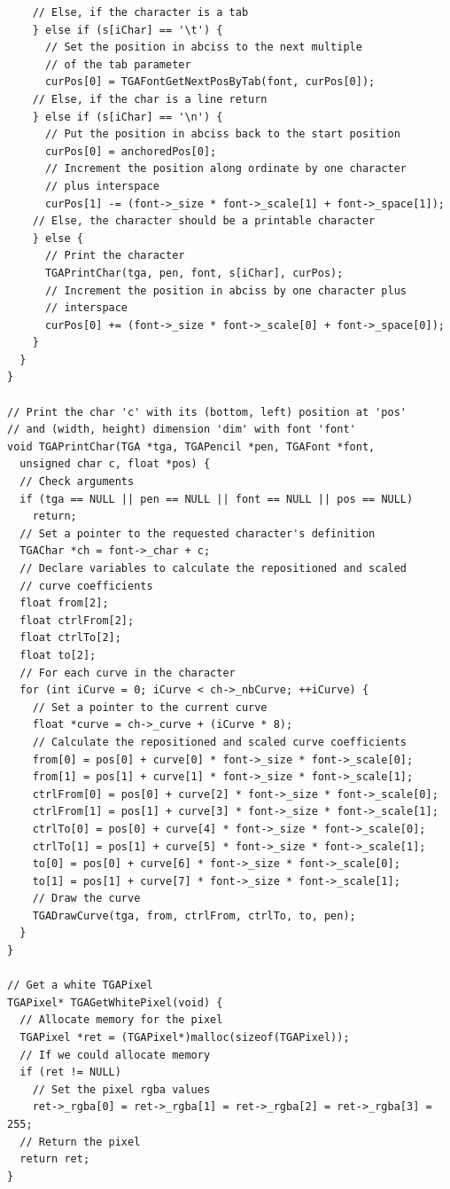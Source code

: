 \documentclass[12pt, a4paper]{article}
\begin{document}
\begin{scriptsize}
\begin{ttfamily}
\begin{lstlisting}
    // Else, if the character is a tab
    } else if (s[iChar] == '\t') {
      // Set the position in abciss to the next multiple 
      // of the tab parameter
      curPos[0] = TGAFontGetNextPosByTab(font, curPos[0]);
    // Else, if the char is a line return
    } else if (s[iChar] == '\n') {
      // Put the position in abciss back to the start position
      curPos[0] = anchoredPos[0];
      // Increment the position along ordinate by one character 
      // plus interspace
      curPos[1] -= (font->_size * font->_scale[1] + font->_space[1]);
    // Else, the character should be a printable character
    } else {
      // Print the character
      TGAPrintChar(tga, pen, font, s[iChar], curPos);
      // Increment the position in abciss by one character plus
      // interspace
      curPos[0] += (font->_size * font->_scale[0] + font->_space[0]);
    }
  }
}

// Print the char 'c' with its (bottom, left) position at 'pos'
// and (width, height) dimension 'dim' with font 'font'
void TGAPrintChar(TGA *tga, TGAPencil *pen, TGAFont *font, 
  unsigned char c, float *pos) {
  // Check arguments
  if (tga == NULL || pen == NULL || font == NULL || pos == NULL)
    return;
  // Set a pointer to the requested character's definition
  TGAChar *ch = font->_char + c;
  // Declare variables to calculate the repositioned and scaled 
  // curve coefficients
  float from[2];
  float ctrlFrom[2];
  float ctrlTo[2];
  float to[2];
  // For each curve in the character
  for (int iCurve = 0; iCurve < ch->_nbCurve; ++iCurve) {
    // Set a pointer to the current curve
    float *curve = ch->_curve + (iCurve * 8);
    // Calculate the repositioned and scaled curve coefficients
    from[0] = pos[0] + curve[0] * font->_size * font->_scale[0];
    from[1] = pos[1] + curve[1] * font->_size * font->_scale[1];
    ctrlFrom[0] = pos[0] + curve[2] * font->_size * font->_scale[0];
    ctrlFrom[1] = pos[1] + curve[3] * font->_size * font->_scale[1];
    ctrlTo[0] = pos[0] + curve[4] * font->_size * font->_scale[0];
    ctrlTo[1] = pos[1] + curve[5] * font->_size * font->_scale[1];
    to[0] = pos[0] + curve[6] * font->_size * font->_scale[0];
    to[1] = pos[1] + curve[7] * font->_size * font->_scale[1];
    // Draw the curve
    TGADrawCurve(tga, from, ctrlFrom, ctrlTo, to, pen);
  }
}
  
// Get a white TGAPixel
TGAPixel* TGAGetWhitePixel(void) {
  // Allocate memory for the pixel
  TGAPixel *ret = (TGAPixel*)malloc(sizeof(TGAPixel));
  // If we could allocate memory
  if (ret != NULL)
    // Set the pixel rgba values
    ret->_rgba[0] = ret->_rgba[1] = ret->_rgba[2] = ret->_rgba[3] = 255;
  // Return the pixel
  return ret;
}


\end{lstlisting}
\end{ttfamily}
\end{scriptsize}
\end{document}
